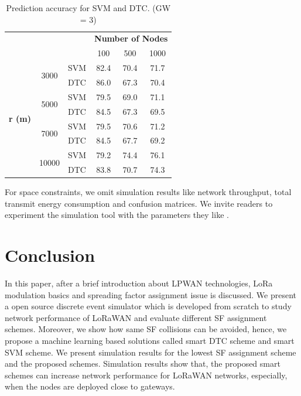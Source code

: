 \documentclass[conference]{IEEEtran}
\begin{document}
\begin{table}
\centering
\caption{Prediction accuracy for SVM and DTC. (GW = 3)}
\label{table:prediction_accuracy}
\begin{tabular}{|c|c|c|c|c|c|}
\hline
\multicolumn{3}{|c|}{\multirow{2}{*}{}}                        & \multicolumn{3}{c|}{\textbf{Number of Nodes}} \\ \cline{4-6}
\multicolumn{3}{|c|}{}                                         & 100           & 500           & 1000          \\ \hline
\multirow{8}{*}{\textbf{r (m)}} & \multirow{2}{*}{3000}  & SVM & 82.4          & 70.4          & 71.7          \\ \cline{3-6}
                                &                        & DTC & 86.0          & 67.3          & 70.4          \\ \cline{2-6}

                                & \multirow{2}{*}{5000}  & SVM & 79.5          & 69.0          & 71.1          \\ \cline{3-6}
                                &                        & DTC & 84.5          & 67.3          & 69.5          \\ \cline{2-6}

                                & \multirow{2}{*}{7000}  & SVM & 79.5          & 70.6          & 71.2          \\ \cline{3-6}
                                &                        & DTC & 84.5          & 67.7          & 69.2          \\ \cline{2-6}

                                & \multirow{2}{*}{10000} & SVM & 79.2          & 74.4          & 76.1          \\ \cline{3-6}
                                &                        & DTC & 83.8          & 70.7          & 74.3          \\ \hline
\end{tabular}
\end{table}

For space constraints, we omit simulation results like network throughput, total transmit energy consumption and confusion matrices. We invite readers to experiment the simulation tool with the parameters they like \cite{simlorasf}.


\section{Conclusion} \label{Conclusion}
In this paper, after a brief introduction about LPWAN technologies, LoRa modulation basics and spreading factor assignment issue is discussed. We present a open source discrete event simulator which is developed from scratch to study network performance of LoRaWAN and evaluate different SF assignment schemes. Moreover, we show how same SF collisions can be avoided, hence, we propose a machine learning based solutions called smart DTC scheme and smart SVM scheme. We present simulation results for the lowest SF assignment scheme and the proposed schemes. Simulation results show that, the proposed smart schemes can increase network performance for LoRaWAN networks, especially, when the nodes are deployed close to gateways.
\end{document}
